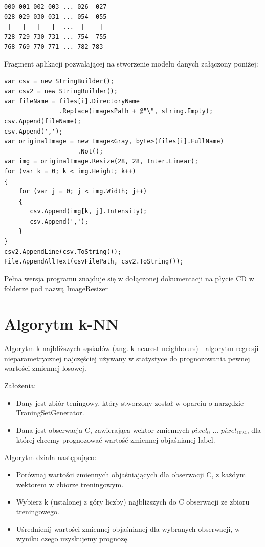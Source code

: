 \documentclass[brudnopis]{xmgr}
\begin{document}
\begin{lstlisting}
000 001 002 003 ... 026  027
028 029 030 031 ... 054  055
 |   |   |   |  ...  |    |
728 729 730 731 ... 754  755
768 769 770 771 ... 782 783 
\end{lstlisting} 
\newpage

Fragment aplikacji pozwalającej na stworzenie modelu danych załączony poniżej:

\begin{verbatim}
var csv = new StringBuilder();
var csv2 = new StringBuilder();
var fileName = files[i].DirectoryName
               .Replace(imagesPath + @"\", string.Empty);
csv.Append(fileName);
csv.Append(',');
var originalImage = new Image<Gray, byte>(files[i].FullName)
                    .Not();
var img = originalImage.Resize(28, 28, Inter.Linear);
for (var k = 0; k < img.Height; k++)
{
    for (var j = 0; j < img.Width; j++)
    {
       csv.Append(img[k, j].Intensity);
       csv.Append(',');
    }
}
csv2.AppendLine(csv.ToString());
File.AppendAllText(csvFilePath, csv2.ToString());
\end{verbatim}

Pełna wersja programu znajduje się w dołączonej dokumentacji na płycie CD w folderze pod nazwą ImageResizer

\section{Algorytm k-NN}

Algorytm k-najbliższych sąsiadów (ang. k nearest neighbours)\cite{2}\cite{11} - algorytm regresji nieparametrycznej najczęściej używany w statystyce do prognozowania pewnej wartości zmiennej losowej.
\newpage

Założenia:
\begin{itemize}
\item
Dany jest zbiór teningowy, który stworzony został w oparciu o narzędzie TraningSetGenerator.
\item
Dana jest obserwacja C, zawierająca wektor zmiennych $pixel_{0}$ ... $pixel_{1024}$, dla której chcemy prognozować wartość zmiennej objaśnianej label.
\end{itemize}	

Algorytm działa następująco:
\begin{itemize}
\item
Porównaj wartości zmiennych objaśniających dla obserwacji C, z każdym wektorem w zbiorze treningowym.
\item
Wybierz k (ustalonej z góry liczby) najbliższych do C obserwacji ze zbioru treningowego.
\item
Uśrednienij wartości zmiennej objaśnianej dla wybranych obserwacji, w wyniku czego uzyskujemy prognozę.	
\end{itemize}	
     
\end{document}
